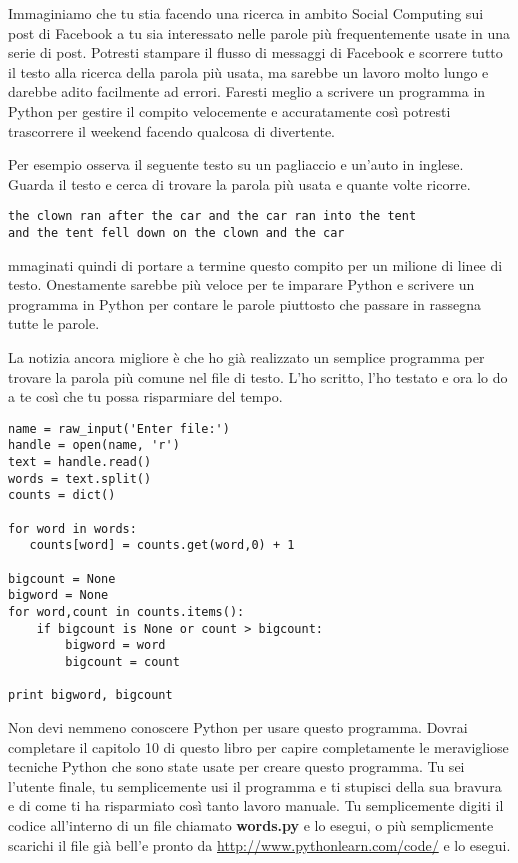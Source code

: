 Immaginiamo che tu stia facendo una ricerca in ambito Social Computing sui post di Facebook a tu sia interessato nelle parole pi\`{u} frequentemente usate in una serie di post. Potresti stampare il flusso di messaggi di Facebook e scorrere tutto il testo alla ricerca della parola pi\`{u} usata, ma sarebbe un lavoro molto lungo e darebbe adito facilmente ad errori. Faresti meglio a scrivere un programma in Python per gestire il compito velocemente e accuratamente cos\`{i} potresti trascorrere il weekend facendo qualcosa di divertente.


Per esempio osserva il seguente testo su un pagliaccio e un'auto in inglese. Guarda il testo e cerca di trovare la parola pi\`{u} usata e quante volte ricorre.


\beforeverb
\begin{verbatim}
the clown ran after the car and the car ran into the tent 
and the tent fell down on the clown and the car 
\end{verbatim}
\afterverb
%
mmaginati quindi di portare a termine questo compito per un milione di linee di testo. Onestamente sarebbe pi\`{u} veloce per te imparare Python e scrivere un programma in Python per contare le parole piuttosto che passare in rassegna tutte le parole.


La notizia ancora migliore \`{e} che ho gi\`{a} realizzato un semplice programma per trovare la parola pi\`{u} comune nel file di testo. L'ho scritto, l'ho testato e ora lo do a te cos\`{i} che tu possa risparmiare del tempo.

\beforeverb
\begin{verbatim}
name = raw_input('Enter file:')
handle = open(name, 'r')
text = handle.read()
words = text.split()
counts = dict()

for word in words:
   counts[word] = counts.get(word,0) + 1

bigcount = None
bigword = None
for word,count in counts.items():
    if bigcount is None or count > bigcount:
        bigword = word
        bigcount = count

print bigword, bigcount
\end{verbatim}
\afterverb
%
Non devi nemmeno conoscere Python per usare questo programma. Dovrai completare il capitolo 10 di questo libro per capire completamente le meravigliose tecniche Python che sono state usate per creare questo programma. Tu sei l'utente finale, tu semplicemente usi il programma e ti stupisci della sua bravura e di come ti ha risparmiato cos\`{i} tanto lavoro manuale. Tu semplicemente digiti il codice all'interno di un file chiamato \textbf{words.py} e lo esegui, o pi\`{u} semplicmente scarichi il file gi\`{a} bell'e pronto da \url{http://www.pythonlearn.com/code/} e lo esegui.

